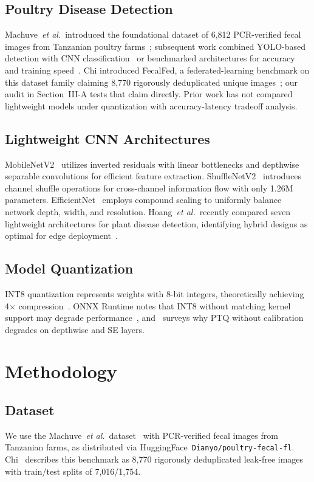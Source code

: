 \documentclass[conference,a4paper]{IEEEtran}
\begin{document}
\subsection{Poultry Disease Detection}
Machuve~\textit{et al.}~introduced the foundational dataset of 6,812 PCR-verified fecal images from Tanzanian poultry farms~\cite{machuve2022}; subsequent work combined YOLO-based detection with CNN classification~\cite{dhungana2025,degu2023} or benchmarked architectures for accuracy and training speed~\cite{tasdelen2025}. Chi introduced FecalFed, a federated-learning benchmark on this dataset family claiming 8,770 rigorously deduplicated unique images~\cite{chi2026}; our audit in Section~III-A tests that claim directly. Prior work has not compared lightweight models under quantization with accuracy-latency tradeoff analysis.

\subsection{Lightweight CNN Architectures}
MobileNetV2~\cite{mobilenetv2} utilizes inverted residuals with linear bottlenecks and depthwise separable convolutions for efficient feature extraction. ShuffleNetV2~\cite{shufflenetv2} introduces channel shuffle operations for cross-channel information flow with only 1.26M parameters. EfficientNet~\cite{efficientnet} employs compound scaling to uniformly balance network depth, width, and resolution. Hoang~\textit{et al.}~recently compared seven lightweight architectures for plant disease detection, identifying hybrid designs as optimal for edge deployment~\cite{hoang2026}.

\subsection{Model Quantization}
INT8 quantization represents weights with 8-bit integers, theoretically achieving 4$\times$ compression~\cite{jacob2018}. ONNX Runtime notes that INT8 without matching kernel support may degrade performance~\cite{onnxruntime2024}, and~\cite{nagel2021} surveys why PTQ without calibration degrades on depthwise and SE layers.

\section{Methodology}

\subsection{Dataset}
We use the Machuve~\textit{et al.}~dataset~\cite{machuve22} with PCR-verified fecal images from Tanzanian farms, as distributed via HuggingFace~\texttt{Dianyo/poultry-fecal-fl}. Chi~\cite{chi2026} describes this benchmark as 8,770 rigorously deduplicated leak-free images with train/test splits of 7,016/1,754.
\end{document}
